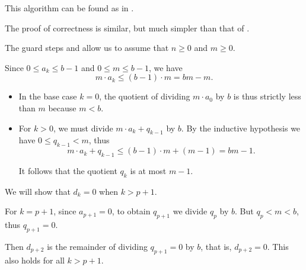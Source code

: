 \begin{comments}
  \item This algorithm can be found as  in \cite{notebook:code}.
\end{comments}
\begin{defproof}
  The proof of correctness is similar, but much simpler than that of .

  The guard steps  and  allow us to assume that \( n \geq 0 \) and \( m \geq 0 \).

   Since \( 0 \leq a_k \leq b - 1 \) and \( 0 \leq m \leq b - 1 \), we have
  \begin{equation*}
    m \cdot a_k \leq (b - 1) \cdot m = bm - m.
  \end{equation*}

  \begin{itemize}
    \item In the base case \( k = 0 \), the quotient of dividing \( m \cdot a_0 \) by \( b \) is thus strictly less than \( m \) because \( m < b \).

    \item For \( k > 0 \), we must divide \( m \cdot a_k + q_{k-1} \) by \( b \). By the inductive hypothesis we have \( 0 \leq q_{k-1} < m \), thus
    \begin{equation*}
      m \cdot a_k + q_{k-1} \leq (b - 1) \cdot m + (m - 1) = bm - 1.
    \end{equation*}

    It follows that the quotient \( q_k \) is at most \( m - 1 \).
  \end{itemize}

   We will show that \( d_k = 0 \) when \( k > p + 1 \).

  For \( k = p + 1 \), since \( a_{p + 1} = 0 \), to obtain \( q_{p + 1} \) we divide \( q_p \) by \( b \). But \( q_p < m < b \), thus \( q_{p + 1} = 0 \).

  Then \( d_{p + 2} \) is the remainder of dividing \( q_{p + 1} = 0 \) by \( b \), that is, \( d_{p + 2} = 0 \). This also holds for all \( k > p + 1 \).



\end{defproof}
